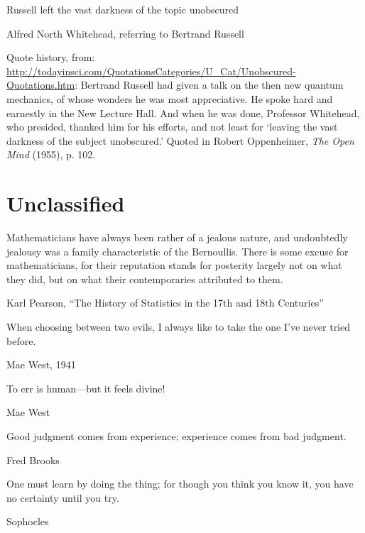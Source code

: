 \epigraph{Russell left the vast darkness of the topic unobscured}{Alfred North Whitehead, referring to Bertrand Russell}

Quote history, from: \url{http://todayinsci.com/QuotationsCategories/U_Cat/Unobscured-Quotations.htm}:
Bertrand Russell had given a talk on the then new quantum mechanics, of whose wonders he was most appreciative. He spoke hard and earnestly in the New Lecture Hall. And when he was done, Professor Whitehead, who presided, thanked him for his efforts, and not least for `leaving the vast darkness of the subject unobscured.'
Quoted in Robert Oppenheimer, \emph{The Open Mind} (1955), p. 102.


\section{Unclassified}


\epigraph{Mathematicians have always been rather of a jealous nature, and undoubtedly jealousy was a family characteristic of the Bernoullis.  There is some excuse for mathematicians, for their reputation stands for posterity largely not on what they did, but on what their contemporaries attributed to them.}{Karl Pearson, ``The History of Statistics in the 17th and 18th Centuries'' \cite[p. 226]{Pearson:1978}}

\epigraph{When choosing between two evils, I always like to take the one I've never tried before.}{Mae West, 1941}

\epigraph{To err is human---but it feels divine!}{Mae West}

\epigraph{Good judgment comes from experience; experience comes from bad judgment.}{Fred Brooks}


\epigraph{One must learn by doing the thing; for though you think you know it, you have no certainty until you try.}{Sophocles}




